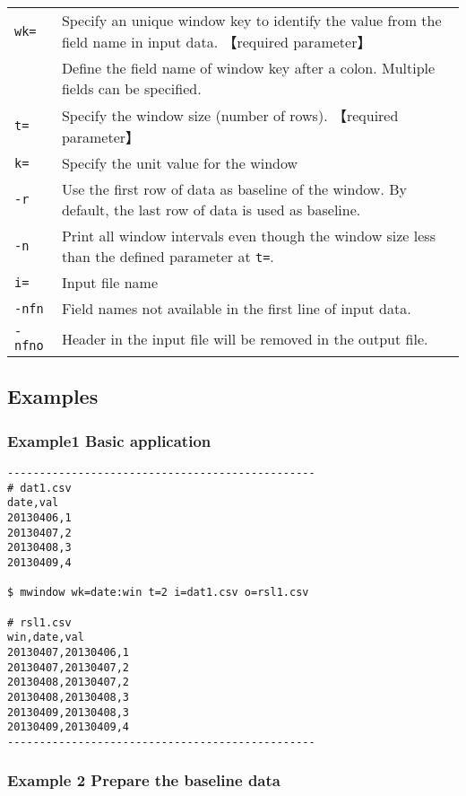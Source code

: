 \documentclass[a4paper]{jarticle}
\begin{document}
\begin{table}[htbp]
{\small
\begin{tabular}{ll}

\verb|wk=|   & Specify an unique window key to identify the value from the field name in input data. 【required parameter】\\
                      & Define the field name of window key after a colon. Multiple fields can be specified.  \\
\verb|t=| & Specify the window size (number of rows). 【required parameter】 \\
\verb|k=|    & Specify the unit value for the window \\
\verb|-r|    & Use the first row of data as baseline of the window. By default, the last row of data is used as baseline.  \\
\verb|-n|    & Print all window intervals even though the window size less than the defined parameter at  \verb|t=|. \\
\verb|i=|    & Input file name\\
\verb|-nfn|  & Field names not available in the first line of input data.\\
\verb|-nfno| & Header in the input file will be removed in the output file.\\
\end{tabular} 
}
\end{table} 

\subsection*{Examples}
\subsubsection*{Example1 Basic application}

\begin{verbatim}
------------------------------------------------
# dat1.csv
date,val
20130406,1
20130407,2
20130408,3
20130409,4

$ mwindow wk=date:win t=2 i=dat1.csv o=rsl1.csv

# rsl1.csv
win,date,val
20130407,20130406,1
20130407,20130407,2
20130408,20130407,2
20130408,20130408,3
20130409,20130408,3
20130409,20130409,4
------------------------------------------------
\end{verbatim}

\subsubsection*{Example 2 Prepare the baseline data}
\end{document}
